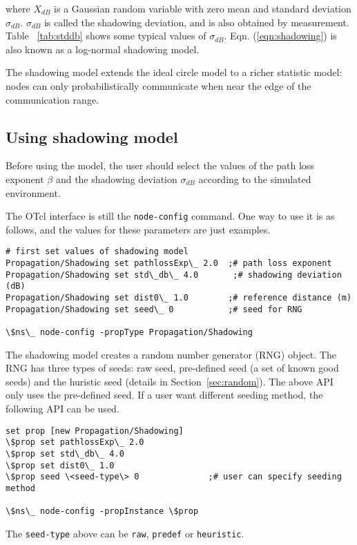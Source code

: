 where $X_{dB}$ is a Gaussian random variable with zero mean and
standard deviation $\sigma_{dB}$. $\sigma_{dB}$ is called the
shadowing deviation, and is also obtained by measurement. Table
~\ref{tab:stddb} shows some typical values of $\sigma_{dB}$. Eqn.
(\ref{eqn:shadowing}) is also known as a log-normal shadowing model.

The shadowing model extends the ideal circle model to a richer
statistic model: nodes can only probabilistically communicate when
near the edge of the communication range.


\subsection{Using shadowing model}

Before using the model, the user should select the values of the path
loss exponent $\beta$ and the shadowing deviation $\sigma_{dB}$
according to the simulated environment.

The OTcl interface is still the {\tt node-config} command. One way to
use it is as follows, and the values for these parameters are just examples.

\begin{verbatim}
# first set values of shadowing model
Propagation/Shadowing set pathlossExp\_ 2.0  ;# path loss exponent
Propagation/Shadowing set std\_db\_ 4.0       ;# shadowing deviation (dB)
Propagation/Shadowing set dist0\_ 1.0        ;# reference distance (m)
Propagation/Shadowing set seed\_ 0           ;# seed for RNG

\$ns\_ node-config -propType Propagation/Shadowing
\end{verbatim}

The shadowing model creates a random number generator (RNG) object. The RNG has
three types of seeds: raw seed, pre-defined seed (a set of known good seeds)
and the huristic seed (details in Section~\ref{sec:random}). The
above API only uses the pre-defined seed. If a user want different seeding
method, the following API can be used.

\begin{verbatim}
set prop [new Propagation/Shadowing]
\$prop set pathlossExp\_ 2.0
\$prop set std\_db\_ 4.0
\$prop set dist0\_ 1.0
\$prop seed \<seed-type\> 0              ;# user can specify seeding method

\$ns\_ node-config -propInstance \$prop
\end{verbatim}

The {\tt \<seed-type\>} above can be {\tt raw}, {\tt predef} or {\tt heuristic}.


